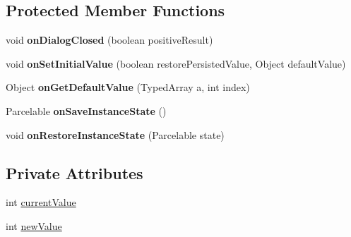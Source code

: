 \subsection*{Protected Member Functions}
\begin{DoxyCompactItemize}
\item 
\hypertarget{classcom_1_1qualoutdoor_1_1recorder_1_1settings_1_1NumberPickerPreference_ad3260645afb631c42024a4a70a55a50d}{void {\bfseries on\-Dialog\-Closed} (boolean positive\-Result)}\label{classcom_1_1qualoutdoor_1_1recorder_1_1settings_1_1NumberPickerPreference_ad3260645afb631c42024a4a70a55a50d}

\item 
\hypertarget{classcom_1_1qualoutdoor_1_1recorder_1_1settings_1_1NumberPickerPreference_a8b381a8ce9b19681ffefcb8d5eca4fa3}{void {\bfseries on\-Set\-Initial\-Value} (boolean restore\-Persisted\-Value, Object default\-Value)}\label{classcom_1_1qualoutdoor_1_1recorder_1_1settings_1_1NumberPickerPreference_a8b381a8ce9b19681ffefcb8d5eca4fa3}

\item 
\hypertarget{classcom_1_1qualoutdoor_1_1recorder_1_1settings_1_1NumberPickerPreference_acf6d845af3fa4cc72e92653763add890}{Object {\bfseries on\-Get\-Default\-Value} (Typed\-Array a, int index)}\label{classcom_1_1qualoutdoor_1_1recorder_1_1settings_1_1NumberPickerPreference_acf6d845af3fa4cc72e92653763add890}

\item 
\hypertarget{classcom_1_1qualoutdoor_1_1recorder_1_1settings_1_1NumberPickerPreference_a08a5554f9d31643a9abec1e9cb509c50}{Parcelable {\bfseries on\-Save\-Instance\-State} ()}\label{classcom_1_1qualoutdoor_1_1recorder_1_1settings_1_1NumberPickerPreference_a08a5554f9d31643a9abec1e9cb509c50}

\item 
\hypertarget{classcom_1_1qualoutdoor_1_1recorder_1_1settings_1_1NumberPickerPreference_a6482b408ea4ad1963969e3c7d9434a0e}{void {\bfseries on\-Restore\-Instance\-State} (Parcelable state)}\label{classcom_1_1qualoutdoor_1_1recorder_1_1settings_1_1NumberPickerPreference_a6482b408ea4ad1963969e3c7d9434a0e}

\end{DoxyCompactItemize}
\subsection*{Private Attributes}
\begin{DoxyCompactItemize}
\item 
int \hyperlink{classcom_1_1qualoutdoor_1_1recorder_1_1settings_1_1NumberPickerPreference_af4e26f16b60f91e13e00758da5ea5ecf}{current\-Value}
\item 
int \hyperlink{classcom_1_1qualoutdoor_1_1recorder_1_1settings_1_1NumberPickerPreference_a3c29dd0a4db25ef361edb52b989e1478}{new\-Value}
\end{DoxyCompactItemize}
